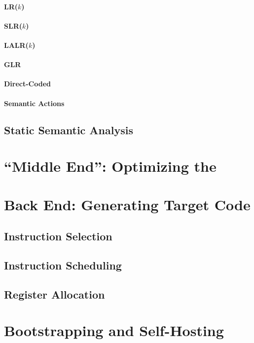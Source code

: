 \paragraph{LR($k$)}
\paragraph{SLR($k$)}
\paragraph{LALR($k$)}
\paragraph{GLR}

\paragraph{Direct-Coded}

\paragraph{Semantic Actions}

\subsection{Static Semantic Analysis}

\section{``Middle End'': Optimizing the }

\section{Back End: Generating Target Code}
\subsection{Instruction Selection}

\subsection{Instruction Scheduling}

\subsection{Register Allocation}

\section{Bootstrapping and Self-Hosting}